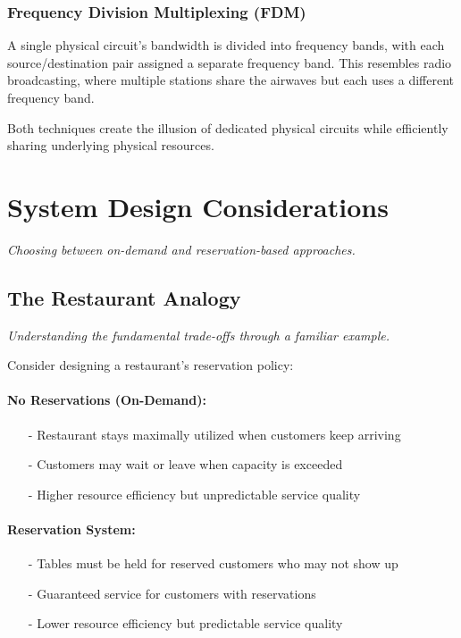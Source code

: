\documentclass[../../compsys.tex]{subfiles}
\begin{document}
\subsubsection{Frequency Division Multiplexing (FDM)}
A single physical circuit's bandwidth is divided into frequency bands, with each source/destination pair assigned a separate frequency band. This resembles radio broadcasting, where multiple stations share the airwaves but each uses a different frequency band.

Both techniques create the illusion of dedicated physical circuits while efficiently sharing underlying physical resources.

\section{System Design Considerations}
\textit{Choosing between on-demand and reservation-based approaches.}

\subsection{The Restaurant Analogy}
\textit{Understanding the fundamental trade-offs through a familiar example.}

Consider designing a restaurant's reservation policy:

\paragraph{No Reservations (On-Demand):}
\begin{itemize}
  \item[-] Restaurant stays maximally utilized when customers keep arriving
  \item[-] Customers may wait or leave when capacity is exceeded
  \item[-] Higher resource efficiency but unpredictable service quality
\end{itemize}

\paragraph{Reservation System:}
\begin{itemize}
  \item[-] Tables must be held for reserved customers who may not show up
  \item[-] Guaranteed service for customers with reservations
  \item[-] Lower resource efficiency but predictable service quality
\end{itemize}
\end{document}
